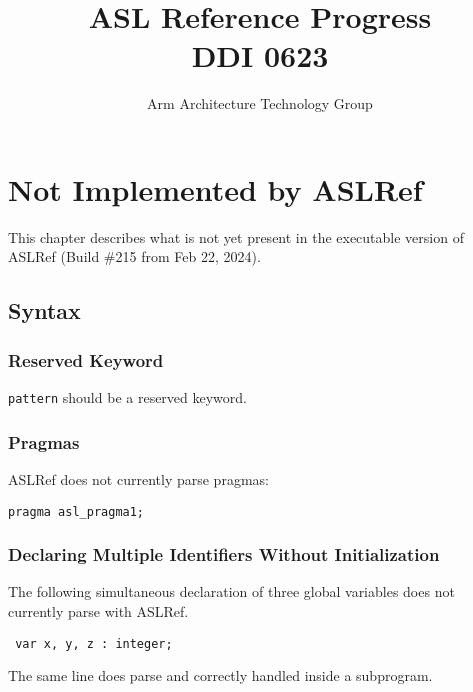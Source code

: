 \documentclass{book}
\author{Arm Architecture Technology Group}
\title{ASL Reference Progress \\
       DDI 0623}
\begin{document}
\maketitle

\tableofcontents{}





\chapter{Not Implemented by ASLRef}

This chapter describes what is not yet present in the executable version of ASLRef
(Build \#215 from Feb 22, 2024).

\section{Syntax}

\subsection{Reserved Keyword}
\texttt{pattern} should be a reserved keyword.

\subsection{Pragmas}
ASLRef does not currently parse pragmas:
\begin{verbatim}
pragma asl_pragma1;
\end{verbatim}


\subsection{Declaring Multiple Identifiers Without Initialization}
The following simultaneous declaration of three global variables does not currently parse with ASLRef.
\begin{verbatim}
 var x, y, z : integer;
\end{verbatim}

The same line does parse and correctly handled inside a subprogram.
\end{document}
